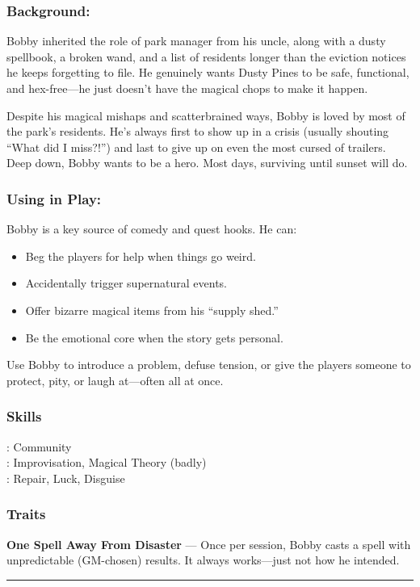 \begin{paracol}{3}
    \subsubsection*{Background:}
    Bobby inherited the role of park manager from his uncle, along with a dusty spellbook, a broken wand, and a list of residents longer than the eviction notices he keeps forgetting to file. He genuinely wants Dusty Pines to be safe, functional, and hex-free—he just doesn’t have the magical chops to make it happen.

    Despite his magical mishaps and scatterbrained ways, Bobby is loved by most of the park’s residents. He’s always first to show up in a crisis (usually shouting “What did I miss?!”) and last to give up on even the most cursed of trailers. Deep down, Bobby wants to be a hero. Most days, surviving until sunset will do.

    \switchcolumn
    \subsubsection*{Using in Play:}
    Bobby is a key source of comedy and quest hooks. He can:
    \begin{itemize}
      \item Beg the players for help when things go weird.
      \item Accidentally trigger supernatural events.
      \item Offer bizarre magical items from his “supply shed.”
      \item Be the emotional core when the story gets personal.
    \end{itemize}
    Use Bobby to introduce a problem, defuse tension, or give the players someone to protect, pity, or laugh at—often all at once.

    \switchcolumn
    \subsubsection{Skills}
      \noindent\Expert: Community \\
      \noindent\Skilled: Improvisation, Magical Theory (badly) \\
      \noindent\Novice: Repair, Luck, Disguise \\
    \subsubsection{Traits}
      \textbf{One Spell Away From Disaster} — Once per session, Bobby casts a spell with unpredictable (GM-chosen) results. It always works—just not how he intended.
\end{paracol}
\vspace{.5\baselineskip}
\hrule
\vspace{.5\baselineskip}

